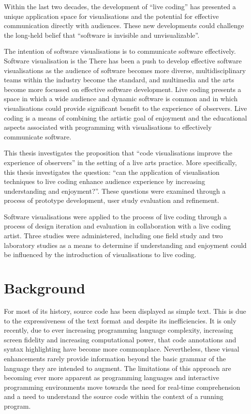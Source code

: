 Within the last two decades, the development of ``live coding'' has presented a unique application space for visualisations and the potential for effective communication directly with audiences. These new developments could challenge the long-held belief that ``software is invisible and unvisualizable''.

The intention of software visualisations is to communicate software effectively. Software visualisation is the 
There has been a push to develop effective software visualisations as the audience of software becomes more diverse, multidisciplinary teams within the industry become the standard, and multimedia and the arts become more focussed on effective software development. Live coding presents a space in which a wide audience and dynamic software is common and in which visualisations could provide significant benefit to the experience of observers. Live coding is a means of combining the artistic goal of enjoyment and the educational aspects associated with programming with visualisations to effectively communicate software.

This thesis investigates the proposition that ``code visualisations improve the experience of observers'' in the setting of a live arts practice. More specifically, this thesis investigates the question: ``can the application of visualisation techniques to live coding enhance audience experience by increasing understanding and enjoyment?''. These questions were examined through a process of prototype development, user study evaluation and refinement.

Software visualisations were applied to the process of live coding through a process of design iteration and evaluation in collaboration with a live coding artist. Three studies were administered, including one field study and two laboratory studies as a means to determine if understanding and enjoyment could be influenced by the introduction of visualisations to live coding.

\section{Background}

For most of its history, source code has been displayed as simple text. This is due to the expressiveness of the text format and despite its inefficiencies. 
It is only recently, due to ever increasing programming language complexity, increasing screen fidelity and increasing computational power, that code annotations and syntax highlighting have become more commonplace. Nevertheless, these visual enhancements rarely provide information beyond the basic grammar of the language they are intended to augment. The limitations of this approach are becoming ever more apparent as programming languages and interactive programming environments move towards the need for real-time comprehension and a need to understand the source code within the context of a running program.

